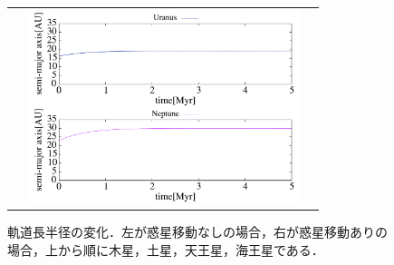 \documentclass[11pt,a4paper,oneside,onecolumn]{jreport}
\begin{document}
\begin{figure}[H]
\begin{tabular}{ccc}
\begin{minipage}[t]{0.1\hsize}
\end{minipage} &
\begin{minipage}[t]{0.45\hsize}
\centering
\includegraphics[width=8cm]{./image/Move500kyr_axis_5Myr_URANEP.pdf}
\end{minipage}
%
\end{tabular}
\caption{軌道長半径の変化．左が惑星移動なしの場合，右が惑星移動ありの場合，上から順に木星，土星，天王星，海王星である．\label{fig:axis}}
\end{figure}
\end{document}
